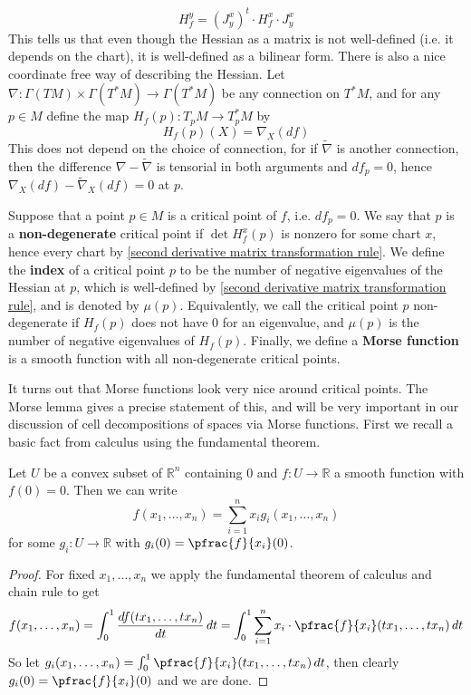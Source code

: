 \begin{equation}
\label{second derivative matrix transformation rule}
H_f^y = (J_y^x)^t \cdot H_f^x \cdot J_y^x
\end{equation}
This tells us that even though the Hessian as a matrix is not well-defined (i.e. it depends on the chart), it is well-defined as a bilinear form. There is also a nice coordinate free way of describing the Hessian. Let $\nabla : \Gamma(TM) \times \Gamma(T^*M) \rightarrow \Gamma(T^*M)$ be any connection on $T^*M$, and for any $p \in M$ define the map $H_f(p) : T_p M \rightarrow T_p^* M$ by
\begin{equation}
\label{connection definition of Hessian}
H_f(p)(X) = \nabla_X (df)
\end{equation}
This does not depend on the choice of connection, for if $\widetilde\nabla$ is another connection, then the difference $\nabla-\widetilde\nabla$ is tensorial in both arguments and $df_p=0$, hence $\nabla_X(df)-\widetilde\nabla_X(df)=0$ at $p$.

Suppose that a point $p \in M$ is a critical point of $f$, i.e. $df_p=0$. We say that $p$ is a \textbf{non-degenerate} critical point if $\det H_f^x(p)$ is nonzero for some chart $x$, hence every chart by \eqref{second derivative matrix transformation rule}. We define the \textbf{index} of a critical point $p$ to be the number of negative eigenvalues of the Hessian at $p$, which is well-defined by \eqref{second derivative matrix transformation rule}, and is denoted by $\mu(p)$. Equivalently, we call the critical point $p$ non-degenerate if $H_f(p)$ does not have 0 for an eigenvalue, and $\mu(p)$ is the number of negative eigenvalues of $H_f(p)$. Finally, we define a \textbf{Morse function} is a smooth function with all non-degenerate critical points. 

It turns out that Morse functions look very nice around critical points. The Morse lemma gives a precise statement of this, and will be very important in our discussion of cell decompositions of spaces via Morse functions. First we recall a basic fact from calculus using the fundamental theorem.

\begin{lem}
\label{FTC cor}
Let $U$ be a convex subset of $\mathbb R^n$ containing 0 and $f : U \rightarrow \mathbb R$ a smooth function with $f(0) = 0$. Then we can write
\[ f(x_1,\ldots,x_n) = \sum_{i=1}^n x_i g_i(x_1,\ldots,x_n) \]
for some $g_i : U \rightarrow \mathbb R$ with $g_i(0) = \pfrac{f}{x_i}(0)$.
\end{lem}
\begin{proof}
For fixed $x_1,\ldots,x_n$ we apply the fundamental theorem of calculus and chain rule to get
\[ f(x_1,\ldots,x_n) = \int_0^1 \frac{df(tx_1,\ldots,tx_n)}{dt} \, dt = \int_0^1 \sum_{i=1}^n x_i \cdot \pfrac{f}{x_i}(tx_1,\ldots,tx_n) \, dt \]
So let $g_i(x_1,\ldots,x_n) = \int_0^1 \pfrac{f}{x_i}(tx_1,\ldots,tx_n) \, dt$, then clearly $g_i(0) = \pfrac{f}{x_i}(0)$ and we are done.
\end{proof}


